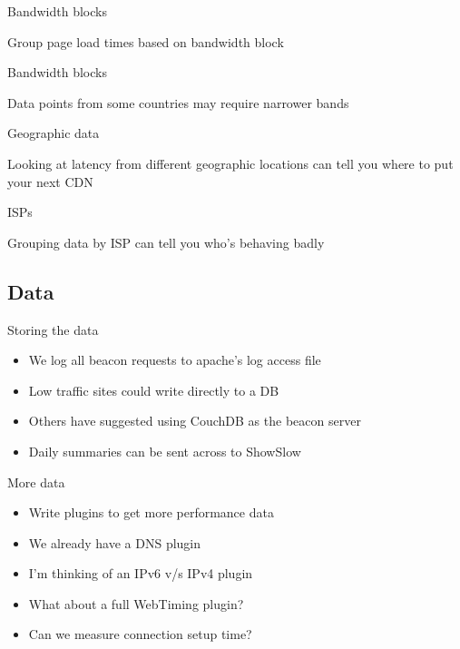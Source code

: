 \documentclass{beamer}
\begin{document}
\begin{frame}{Bandwidth blocks}
  \begin{center}
  Group page load times based on bandwidth block
  \end{center}
\end{frame}

\begin{frame}{Bandwidth blocks}
  \begin{center}
  Data points from some countries may require narrower bands
  \end{center}
\end{frame}

\begin{frame}{Geographic data}
  \begin{center}
  Looking at latency from different geographic locations can tell you where to put your next CDN
  \end{center}
\end{frame}

\begin{frame}{ISPs}
  \begin{center}
  Grouping data by ISP can tell you who's behaving badly
  \end{center}
\end{frame}

\subsection{Data}

\begin{frame}{Storing the data}
  \begin{itemize}
  \item We log all beacon requests to apache's log access file
  \item Low traffic sites could write directly to a DB
  \item Others have suggested using CouchDB as the beacon server
  \item Daily summaries can be sent across to ShowSlow
  \end{itemize}
\end{frame}

\begin{frame}{More data}
  \begin{itemize}
  \item Write plugins to get more performance data
  \item We already have a DNS plugin
  \item I'm thinking of an IPv6 v/s IPv4 plugin
  \item What about a full WebTiming plugin?
  \item Can we measure connection setup time?
  \end{itemize}
\end{frame}
\end{document}
